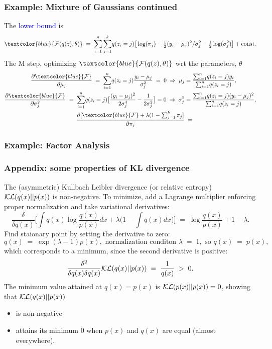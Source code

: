 \documentclass[10pt]{beamer}
\newcommand{\Blue}{\textcolor{blue}}
\newcommand{\y}{y}
\newcommand{\z}{z}
\begin{document}
\begin{frame}
\frametitle{Example: Mixture of Gaussians continued}

The \Blue{lower bound} is
\[
\Blue{{\cal F}(q(\z),\theta)}\;=\;\sum_{i=1}^n\sum_{j=1}^k\!q(\z_i=j)
\big[\log(\pi_j)-\tfrac{1}{2}(\y_i-\mu_j)^2/\sigma_j^2-\tfrac{1}{2}\log(\sigma_j^2)\big]+{\rm const}.
\]
The M step, optimizing $\Blue{{\cal F}(q(\z),\theta)}$ wrt the parameters, $\theta$
\[
\begin{split}
\frac{\partial\Blue{{\cal F}}}{\partial\mu_j}\;=\;
\sum_{i=1}^n\!q(\z_i=j)\frac{\y_i-\mu_j}{\sigma_j^2}\;=\;0\;\Rightarrow\;
\mu_j&=\frac{\sum_{i=1}^n\!q(\z_i=j)\y_i}{\sum_{i=1}^n\!q(\z_i=j)},\\
\frac{\partial\Blue{{\cal F}}}{\partial\sigma^2_j}\;=\;
\sum_{i=1}^n\!q(\z_i=j)\big[\frac{(\y_i-\mu_j)^2}{2\sigma_j^4}-\frac{1}{2\sigma_j^2}\big]=0
\;\Rightarrow\;\sigma_j^2&=\frac{\sum_{i=1}^n\!q(\z_i=j)(\y_i-\mu_j)^2}{\sum_{i=1}^n\!q(\z_i=j)},\\
\frac{\partial[\Blue{{\cal F}}+\lambda(1-\sum_{j=1}^k\pi_j]}{\partial\pi_j}&\;=\;
\end{split}
\]
\end{frame}

\begin{frame}
\frametitle{Example: Factor Analysis}

\end{frame}

\begin{frame}
\frametitle{Appendix: some properties of KL divergence}

The (asymmetric) Kullbach Leibler divergence (or relative entropy) ${\cal KL}(q(x)||p(x))$ is non-negative. To minimize, add a Lagrange multiplier enforcing proper normalization and take variational derivatives:
\[
\frac{\delta}{\delta q(x)}\Big[\int q(x)\log\frac{q(x)}{p(x)}dx+\lambda\big(1-\int q(x)dx\big)\Big]\;
=\;\log\frac{q(x)}{p(x)}+1-\lambda.
\]
Find staionary point by setting the derivative to zero:
\[
q(x)\;=\;\exp(\lambda-1)p(x),\text{\ \ normalization conditon\ }\lambda\;=\;1, \text{\ \ so\ }q(x)\;=\;p(x),
\]
which corresponds to a minimum, since the second derivative is positive:
\[
\frac{\delta^2}{\delta q(x)\delta q(x)}{\cal KL}(q(x)||p(x))\;=\;\frac{1}{q(x)}\;>\;0.
\]
The minimum value attained at $q(x)=p(x)$ is ${\cal KL}(p(x)||p(x))=0$, showing that 
${\cal KL}(q(x)||p(x))$
\begin{itemize}
\item is non-negative
\item attains its minimum 0 when $p(x)$ and $q(x)$ are equal (almost everywhere).
\end{itemize}
\end{frame}
\end{document}
